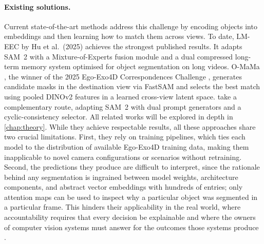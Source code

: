\paragraph{Existing solutions.} Current state-of-the-art methods address this challenge by encoding objects into embeddings and then learning how to match them across views. To date, LM-EEC by Hu et al.\ (2025)
\cite{hu2025lmeec} achieves the strongest published results. It adapts SAM~2 with a Mixture-of-Experts fusion module and a dual compressed long-term memory system optimised for object segmentation on long
videos.  O-MaMa \cite{o-mama}, the winner of the 2025 Ego-Exo4D Correspondences Challenge \cite{leaderboard}, generates candidate
masks in the destination view via FastSAM and selects the best match using pooled DINOv2 features in a learned cross-view latent space. \cite{pan2025v2sam} take a complementary route, adapting SAM~2 with dual
prompt generators and a cyclic-consistency selector. All related works will be explored in depth in \cref{chap:theory}. While they achieve respectable results, all these approaches share two crucial limitations.
First, they rely on training pipelines, which ties each model to the distribution of available Ego-Exo4D training data, making them inapplicable to novel camera configurations or scenarios without retraining.
Second, the predictions they produce are difficult to interpret, since the rationale behind any segmentation is ingrained between model weights, architecture components, and abstract vector embeddings with
hundreds of entries; only attention maps can be used to inspect why a particular object was segmented in a particular frame. This hinders their applicability in the real world, where accountability requires that
every decision be explainable and where the owners of computer vision systems must answer for the outcomes those systems produce \cite{xai-sensors}.

